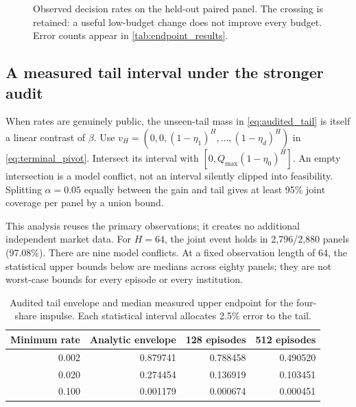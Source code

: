 \documentclass[11pt,a4paper]{article}
\theoremstyle{definition}
\theoremstyle{remark}
\begin{document}
\begin{figure}[htbp]
\centering
{}
\caption{Observed decision rates on the held-out paired panel. The crossing is retained: a useful low-budget change does not improve every budget. Error counts appear in \cref{tab:endpoint_results}.}
\label{fig:endpoint_tradeoff}
\end{figure}

\subsection{A measured tail interval under the stronger audit}
When rates are genuinely public, the unseen-tail mass in \cref{eq:audited_tail} is itself a linear contrast of $\beta$. Use
$v_H=(0,0,(1-\eta_1)^H,\ldots,(1-\eta_d)^H)$ in \cref{eq:terminal_pivot}. Intersect its interval with $[0,Q_{\max}(1-\eta_0)^H]$. An empty intersection is a model conflict, not an interval silently clipped into feasibility. Splitting $\alpha=0.05$ equally between the gain and tail gives at least 95\% joint coverage per panel by a union bound.

This analysis reuses the primary observations; it creates no additional independent market data. For $H=64$, the joint event holds in 2,796/2,880 panels (97.08\%). There are nine model conflicts. At a fixed observation length of 64, the statistical upper bounds below are medians across eighty panels; they are not worst-case bounds for every episode or every institution.
\begin{table}[htbp]
\centering\small
\caption{Audited tail envelope and median measured upper endpoint for the four-share impulse. Each statistical interval allocates 2.5\% error to the tail.}
\begin{tabular}{r r r r}
\toprule
Minimum rate & Analytic envelope & 128 episodes & 512 episodes\\
\midrule
0.002 & 0.879741 & 0.788458 & 0.490520\\
0.020 & 0.274454 & 0.136919 & 0.103451\\
0.100 & 0.001179 & 0.000674 & 0.000451\\
\bottomrule
\end{tabular}
\end{table}
\end{document}
